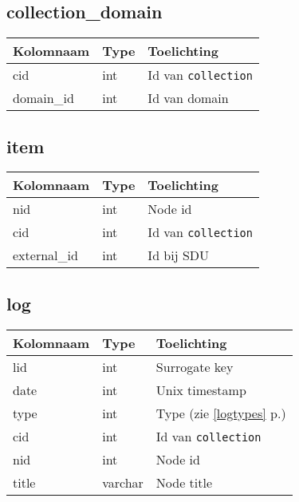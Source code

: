 \documentclass[12pt]{article}
\newcommand{\seeone}[1]{ (zie \ref{#1} p.\pageref{#1})}
\begin{document}
\subsection*{collection\_domain}
\begin{tabular}{p{} | p{} | p{} }
\textbf{Kolomnaam} & \textbf{Type} & \textbf{Toelichting} \\
\hline
cid & int & Id van \texttt{collection} \\
domain\_id & int & Id van domain
\end{tabular}

\subsection*{item}
\begin{tabular}{p{} | p{} | p{} }
\textbf{Kolomnaam} & \textbf{Type} & \textbf{Toelichting} \\
\hline
nid & int & Node id \\
cid & int & Id van \texttt{collection} \\
external\_id & int & Id bij SDU
\end{tabular}

\subsection*{log}
\begin{tabular}{p{} | p{} | p{} }
\textbf{Kolomnaam} & \textbf{Type} & \textbf{Toelichting} \\
\hline
lid & int & Surrogate key \\
date & int & Unix timestamp \\
type & int & Type\seeone{logtypes} \\
cid & int & Id van \texttt{collection} \\
nid & int & Node id \\
title & varchar & Node title
\end{tabular}
\end{document}

